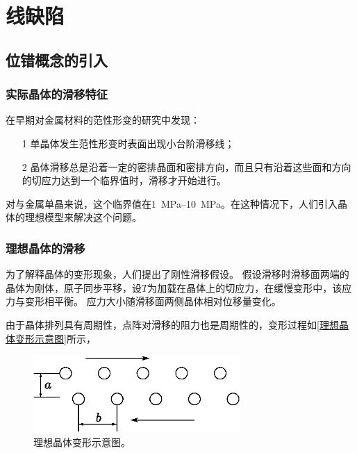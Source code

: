 \chapter{线缺陷}
    \section{位错概念的引入}
        \subsection{实际晶体的滑移特征}
            在早期对金属材料的范性形变的研究中发现：
            \begin{itemize}
                \item[1] 单晶体发生范性形变时表面出现小台阶滑移线；
                \item[2] 晶体滑移总是沿着一定的密排晶面和密排方向，而且只有沿着这些面和方向的切应力达到一个临界值时，滑移才开始进行。
            \end{itemize}
            对与金属单晶来说，这个临界值在\SIrange{1}{10}{\MPa}。在这种情况下，人们引入晶体的理想模型来解决这个问题。

        \subsection{理想晶体的滑移}
            为了解释晶体的变形现象，人们提出了刚性滑移假设。
            假设滑移时滑移面两端的晶体为刚体，原子同步平移，设$T$为加载在晶体上的切应力，在缓慢变形中，该应力与变形相平衡。
            应力大小随滑移面两侧晶体相对位移量变化。

            由于晶体排列具有周期性，点阵对滑移的阻力也是周期性的，变形过程如\autoref{理想晶体变形示意图}所示，
            \begin{figure}[ht]
                \centering
                \includegraphics[width=0.7\textwidth]{fig/理想晶体变形示意图.eps}
                \caption{理想晶体变形示意图。}
                \label{理想晶体变形示意图}
            \end{figure}
            
